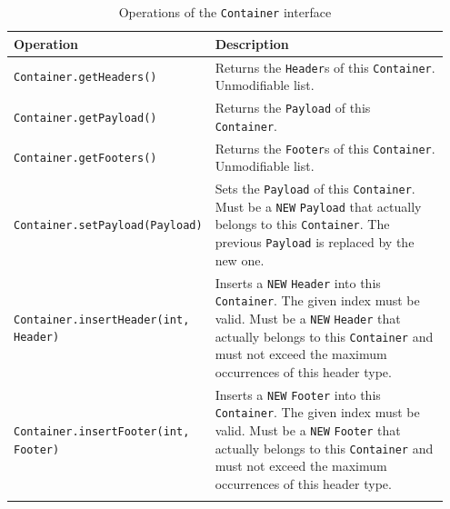 \small
\begin{landscape}
\begin{longtable}{|p{0.3\linewidth}|p{0.65\linewidth}|}
\hline
\rowcolor[gray]{.9}\textbf{Operation} & \textbf{Description} \\
\endhead
\hline
\texttt{Container}\linebreak\texttt{.getHeaders()} & Returns the \texttt{Header}s of this \texttt{Container}. Unmodifiable list. \\
\hline
\texttt{Container}\linebreak\texttt{.getPayload()} & Returns the \texttt{Payload} of this \texttt{Container}. \\
\hline
\texttt{Container}\linebreak\texttt{.getFooters()} & Returns the \texttt{Footer}s of this \texttt{Container}. Unmodifiable list. \\
\hline
\texttt{Container}\linebreak\texttt{.setPayload(Payload)} & Sets the \texttt{Payload} of this \texttt{Container}. Must be a \texttt{NEW} \texttt{Payload} that actually belongs to this \texttt{Container}. The previous \texttt{Payload} is replaced by the new one. \\
\hline
\texttt{Container}\linebreak\texttt{.insertHeader(int, Header)} & Inserts a \texttt{NEW} \texttt{Header} into this \texttt{Container}. The given index must be valid. Must be a \texttt{NEW} \texttt{Header} that actually belongs to this \texttt{Container} and must not exceed the maximum occurrences of this header type. \\
\hline
\texttt{Container}\linebreak\texttt{.insertFooter(int, Footer)} & Inserts a \texttt{NEW} \texttt{Footer} into this \texttt{Container}. The given index must be valid. Must be a \texttt{NEW} \texttt{Footer} that actually belongs to this \texttt{Container} and must not exceed the maximum occurrences of this header type. \\
\hline
\caption{Operations of the \texttt{Container} interface}
\label{tab:DBOpsContainer}
\end{longtable}
\end{landscape}
\normalsize

